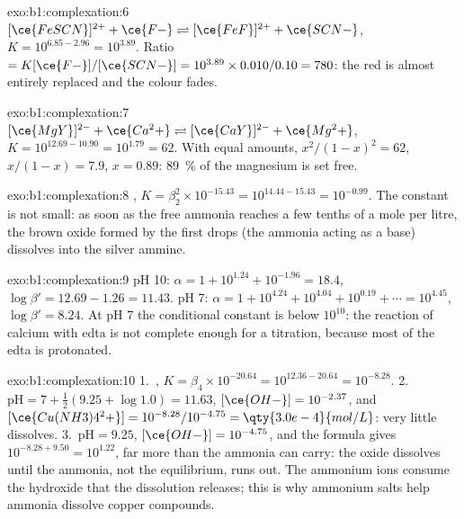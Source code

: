 \begin{solution}{exo:b1:complexation:6}
$[\ce{FeSCN}]^{2+} + \ce{F-} \rightleftharpoons [\ce{FeF}]^{2+} + \ce{SCN-}$,
$K = 10^{6.85 - 2.96} = 10^{3.89}$. Ratio $= K[\ce{F-}]/[\ce{SCN-}] =
10^{3.89} \times 0.010/0.10 = 780$: the red  is almost entirely
replaced and the colour fades.
\end{solution}

\begin{solution}{exo:b1:complexation:7}
$[\ce{MgY}]^{2-} + \ce{Ca^2+} \rightleftharpoons [\ce{CaY}]^{2-} + \ce{Mg^2+}$,
$K = 10^{12.69 - 10.90} = 10^{1.79} = 62$. With equal amounts,
$x^2/(1 - x)^2 = 62$, $x/(1 - x) = 7.9$, $x = 0.89$: \qty{89}{\percent} of
the magnesium is set free.
\end{solution}

\begin{solution}{exo:b1:complexation:8}
, $K = \beta_2^2 \times
10^{-15.43} = 10^{14.44 - 15.43} = 10^{-0.99}$. The constant is not
small: as soon as the free ammonia reaches a few tenths of a mole per
litre, the brown oxide formed by the first drops (the ammonia acting as a
base) dissolves into the silver ammine.
\end{solution}

\begin{solution}{exo:b1:complexation:9}
pH 10: $\alpha = 1 + 10^{1.24} + 10^{-1.96} = 18.4$, $\log\beta' = 12.69 -
1.26 = 11.43$. pH 7: $\alpha = 1 + 10^{4.24} + 10^{4.04} + 10^{0.19} +
\cdots = 10^{4.45}$, $\log\beta' = 8.24$. At pH 7 the conditional constant
is below $10^{10}$: the reaction of calcium with edta is not complete
enough for a titration, because most of the edta is protonated.
\end{solution}

\begin{solution}{exo:b1:complexation:10}
1.~, $K = \beta_4 \times
10^{-20.64} = 10^{12.36 - 20.64} = 10^{-8.28}$.
2.~$\mathrm{pH} = 7 + \frac12(9.25 + \log 1.0) = 11.63$, $[\ce{OH-}] =
10^{-2.37}$, and $[\ce{Cu(NH3)4^2+}] = 10^{-8.28}/10^{-4.75} =
\qty{3.0e-4}{mol/L}$: very little dissolves.
3.~$\mathrm{pH} = 9.25$, $[\ce{OH-}] = 10^{-4.75}$, and the formula gives
$10^{-8.28 + 9.50} = 10^{1.22}$, far more than the ammonia can carry: the
oxide dissolves until the ammonia, not the equilibrium, runs out. The
ammonium ions consume the hydroxide that the dissolution releases; this
is why ammonium salts help ammonia dissolve copper compounds.
\end{solution}

